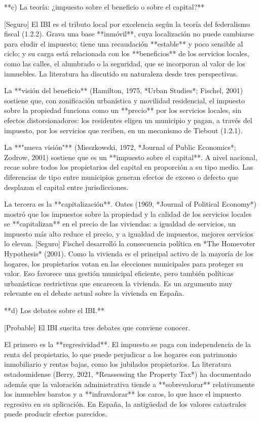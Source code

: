 \documentclass[10pt,a4paper]{article}
\begin{document}
**c) La teoría: ¿impuesto sobre el beneficio o sobre el capital?**

[Seguro] El IBI es el tributo local por excelencia según la teoría del federalismo fiscal (1.2.2). Grava una base **inmóvil**, cuya localización no puede cambiarse para eludir el impuesto; tiene una recaudación **estable** y poco sensible al ciclo; y su carga está relacionada con los **beneficios** de los servicios locales, como las calles, el alumbrado o la seguridad, que se incorporan al valor de los inmuebles. La literatura ha discutido su naturaleza desde tres perspectivas.

La **visión del beneficio** (Hamilton, 1975, *Urban Studies*; Fischel, 2001) sostiene que, con zonificación urbanística y movilidad residencial, el impuesto sobre la propiedad funciona como un **precio** por los servicios locales, sin efectos distorsionadores: los residentes eligen un municipio y pagan, a través del impuesto, por los servicios que reciben, en un mecanismo de Tiebout (1.2.1).

La **"nueva visión"** (Mieszkowski, 1972, *Journal of Public Economics*; Zodrow, 2001) sostiene que es un **impuesto sobre el capital**. A nivel nacional, recae sobre todos los propietarios del capital en proporción a su tipo medio. Las diferencias de tipo entre municipios generan efectos de exceso o defecto que desplazan el capital entre jurisdicciones.

La tercera es la **capitalización**. Oates (1969, *Journal of Political Economy*) mostró que los impuestos sobre la propiedad y la calidad de los servicios locales se **capitalizan** en el precio de las viviendas: a igualdad de servicios, un impuesto más alto reduce el precio, y a igualdad de impuestos, mejores servicios lo elevan. [Seguro] Fischel desarrolló la consecuencia política en *The Homevoter Hypothesis* (2001). Como la vivienda es el principal activo de la mayoría de los hogares, los propietarios votan en las elecciones municipales para proteger su valor. Eso favorece una gestión municipal eficiente, pero también políticas urbanísticas restrictivas que encarecen la vivienda. Es un argumento muy relevante en el debate actual sobre la vivienda en España.

**d) Los debates sobre el IBI.**

[Probable] El IBI suscita tres debates que conviene conocer.

El primero es la **regresividad**. El impuesto se paga con independencia de la renta del propietario, lo que puede perjudicar a los hogares con patrimonio inmobiliario y rentas bajas, como los jubilados propietarios. La literatura estadounidense (Berry, 2021, *Reassessing the Property Tax*) ha documentado además que la valoración administrativa tiende a **sobrevalorar** relativamente los inmuebles baratos y a **infravalorar** los caros, lo que hace el impuesto regresivo en su aplicación. En España, la antigüedad de los valores catastrales puede producir efectos parecidos.
\end{document}
